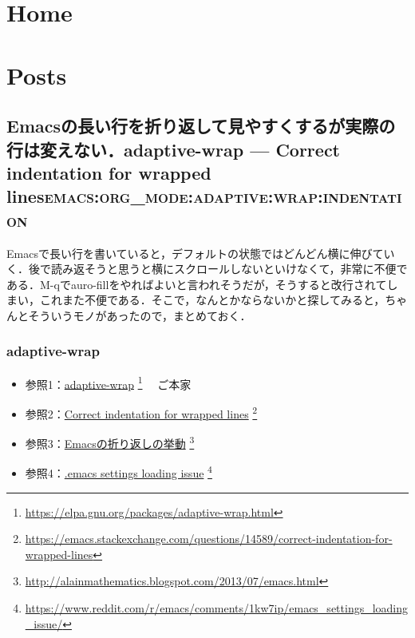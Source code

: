 \documentclass[autodetect-engine,dvipdfmx,12pt,a4paper,ja=standard]{bxjsarticle}
\author{細田弘吉}
\date{\today}
\title{}
\begin{document}
\tableofcontents


\section{Home}
\label{sec:org85fdb33}

\section{Posts}
\label{sec:org9af93a1}
\subsection{Emacsの長い行を折り返して見やすくするが実際の行は変えない．adaptive-wrap --- Correct indentation for wrapped lines\hfill{}\textsc{emacs:org\_mode:adaptive:wrap:indentation}}
\label{sec:org2305e8f}
Emacsで長い行を書いていると，デフォルトの状態ではどんどん横に伸びていく．後で読み返そうと思うと横にスクロールしないといけなくて，非常に不便である．M-qでauro-fillをやればよいと言われそうだが，そうすると改行されてしまい，これまた不便である．そこで，なんとかならないかと探してみると，ちゃんとそういうモノがあったので，まとめておく．

\setcounter{tocdepth}{2}
\tableofcontents

\subsubsection{adaptive-wrap}
\label{sec:org791cf7e}
\begin{itemize}
\item 参照1：\href{https://elpa.gnu.org/packages/adaptive-wrap.html}{adaptive-wrap} \footnote{\url{https://elpa.gnu.org/packages/adaptive-wrap.html}} 　ご本家
\item 参照2：\href{https://emacs.stackexchange.com/questions/14589/correct-indentation-for-wrapped-lines}{Correct indentation for wrapped lines} \footnote{\url{https://emacs.stackexchange.com/questions/14589/correct-indentation-for-wrapped-lines}}
\item 参照3：\href{http://alainmathematics.blogspot.com/2013/07/emacs.html}{Emacsの折り返しの挙動} \footnote{\url{http://alainmathematics.blogspot.com/2013/07/emacs.html}}
\item 参照4：\href{https://www.reddit.com/r/emacs/comments/1kw7ip/emacs_settings_loading_issue/}{.emacs settings loading issue} \footnote{\url{https://www.reddit.com/r/emacs/comments/1kw7ip/emacs_settings_loading_issue/}} 　
\end{itemize}
\end{document}
